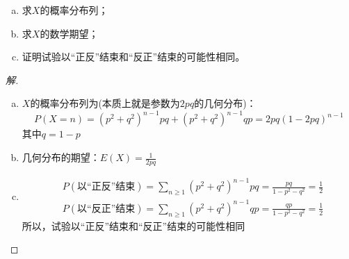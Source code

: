 \documentclass[12pt]{article}
\begin{document}
\begin{enumerate}
{\begin{enumerate}[(a)]
	\item 求$X$的概率分布列；
	\item 求$X$的数学期望；
	\item 证明试验以“正反”结束和“反正”结束的可能性相同。
\end{enumerate}}
\begin{proof}[解]
	\begin{enumerate}[(a)]
		\item $X$的概率分布列为(本质上就是参数为$2pq$的几何分布)：
		\begin{equation*}
		P(X=n)=(p^2+q^2)^{n-1}pq+(p^2+q^2)^{n-1}qp=2pq(1-2pq)^{n-1}
		\end{equation*}
		其中$q=1-p$
		\item 几何分布的期望：$E(X)=\frac{1}{2pq}$
		\item \begin{equation*}
		\begin{aligned}
		&P(\mbox{以“正反”结束})=\sum_{n\geq 1}(p^2+q^2)^{n-1}pq=\frac{pq}{1-p^2-q^2}=\frac{1}{2} \\
		&P(\mbox{以“反正”结束})=\sum_{n\geq 1}(p^2+q^2)^{n-1}qp=\frac{qp}{1-p^2-q^2}=\frac{1}{2}
		\end{aligned}
		\end{equation*}
		所以，试验以“正反”结束和“反正”结束的可能性相同
	\end{enumerate}
\end{proof}


\end{enumerate}
\end{document}

